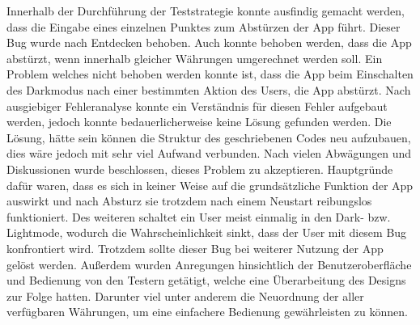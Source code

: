 \documentclass[conference]{IEEEtran}
\begin{document}
Innerhalb der Durchführung der Teststrategie konnte ausfindig gemacht werden, dass die Eingabe eines einzelnen Punktes zum Abstürzen der App führt. Dieser Bug wurde nach Entdecken behoben. Auch konnte behoben werden, dass die App abstürzt, wenn innerhalb gleicher Währungen umgerechnet werden soll.  Ein Problem welches nicht behoben werden konnte ist, dass die App beim Einschalten des Darkmodus nach einer bestimmten Aktion des Users, die App abstürzt. Nach ausgiebiger Fehleranalyse konnte ein Verständnis für diesen Fehler aufgebaut werden, jedoch konnte bedauerlicherweise keine Lösung gefunden werden. Die Lösung, hätte sein können die Struktur des geschriebenen Codes neu aufzubauen, dies wäre jedoch mit sehr viel Aufwand verbunden. Nach vielen Abwägungen und Diskussionen wurde beschlossen, dieses Problem zu akzeptieren. Hauptgründe dafür waren, dass es sich in keiner Weise auf die grundsätzliche Funktion der App auswirkt und nach Absturz sie trotzdem nach einem Neustart reibungslos funktioniert. Des weiteren schaltet ein User meist einmalig in den Dark- bzw. Lightmode, wodurch die Wahrscheinlichkeit sinkt, dass der User mit diesem Bug konfrontiert wird. Trotzdem sollte dieser Bug bei weiterer Nutzung der App gelöst werden. Außerdem wurden Anregungen hinsichtlich der Benutzeroberfläche und Bedienung von den Testern getätigt, welche eine Überarbeitung des Designs zur Folge hatten. Darunter viel unter anderem die Neuordnung der aller verfügbaren Währungen, um eine einfachere Bedienung gewährleisten zu können.
\end{document}

